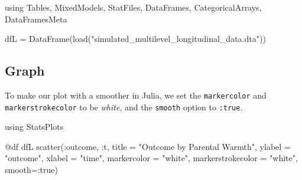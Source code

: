 \documentclass[
  letterpaper,
  DIV=11,
  numbers=noendperiod]{scrreprt}
\newenvironment{Shaded}{\begin{snugshade}}{\end{snugshade}}
\newcommand{\BuiltInTok}[1]{\textcolor[rgb]{0.00,0.23,0.31}{#1}}
\newcommand{\ConstantTok}[1]{\textcolor[rgb]{0.56,0.35,0.01}{#1}}
\newcommand{\FunctionTok}[1]{\textcolor[rgb]{0.28,0.35,0.67}{#1}}
\newcommand{\ImportTok}[1]{\textcolor[rgb]{0.00,0.46,0.62}{#1}}
\newcommand{\NormalTok}[1]{\textcolor[rgb]{0.00,0.23,0.31}{#1}}
\newcommand{\OperatorTok}[1]{\textcolor[rgb]{0.37,0.37,0.37}{#1}}
\newcommand{\PreprocessorTok}[1]{\textcolor[rgb]{0.68,0.00,0.00}{#1}}
\newcommand{\StringTok}[1]{\textcolor[rgb]{0.13,0.47,0.30}{#1}}
\begin{document}
\begin{Shaded}
\begin{Highlighting}[]
\ImportTok{using} \BuiltInTok{Tables}\NormalTok{, }\BuiltInTok{MixedModels}\NormalTok{, }\BuiltInTok{StatFiles}\NormalTok{, }\BuiltInTok{DataFrames}\NormalTok{, }\BuiltInTok{CategoricalArrays}\NormalTok{, }\BuiltInTok{DataFramesMeta}

\NormalTok{dfL }\OperatorTok{=} \FunctionTok{DataFrame}\NormalTok{(}\FunctionTok{load}\NormalTok{(}\StringTok{"simulated\_multilevel\_longitudinal\_data.dta"}\NormalTok{))}
\end{Highlighting}
\end{Shaded}

\subsection{Graph}\label{graph-5}

To make our plot with a smoother in Julia, we set the
\texttt{markercolor} and \texttt{markerstrokecolor} to be \emph{white},
and the \texttt{smooth} option to \texttt{:true}.

\begin{Shaded}
\begin{Highlighting}[]
\ImportTok{using} \BuiltInTok{StatsPlots}

\PreprocessorTok{@df}\NormalTok{ dfL }\FunctionTok{scatter}\NormalTok{(}\OperatorTok{:}\NormalTok{outcome, }\OperatorTok{:}\NormalTok{t, }
\NormalTok{               title }\OperatorTok{=} \StringTok{"Outcome by Parental Warmth"}\NormalTok{,}
\NormalTok{               ylabel }\OperatorTok{=} \StringTok{"outcome"}\NormalTok{,}
\NormalTok{               xlabel }\OperatorTok{=} \StringTok{"time"}\NormalTok{,}
\NormalTok{               markercolor }\OperatorTok{=} \StringTok{"white"}\NormalTok{,}
\NormalTok{               markerstrokecolor }\OperatorTok{=} \StringTok{"white"}\NormalTok{,}
\NormalTok{               smooth}\OperatorTok{=:}\ConstantTok{true}\NormalTok{)}
\end{Highlighting}
\end{Shaded}
\end{document}
